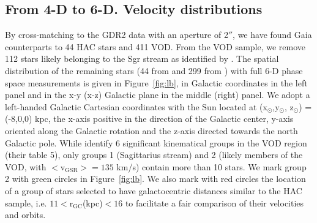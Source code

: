 \documentclass[fleqn,usenatbib]{mnras}
\begin{document}
\subsection{From 4-D to 6-D. Velocity distributions}
%
By cross-matching to the GDR2 data with an aperture of 2$''$, we have
found Gaia counterparts to 44 HAC stars and 411 VOD. From the VOD
sample, we remove 112 stars likely belonging to the Sgr stream as
identified by \citep[][, their group 1]{Vivas2016}. The spatial
distribution of the remaining stars (44 from \citealt{Simion2018} and
299 from \citealt{Vivas2016}) with full 6-D phase space measurements
is given in Figure~\ref{fig:lb}, in Galactic coordinates in the left
panel and in the x-y (x-z) Galactic plane in the middle (right)
panel. We adopt a left-handed Galactic Cartesian coordinates with the
Sun located at (x$_{\odot}$,y$_{\odot}$, z$_{\odot}$) = (-8,0,0) kpc,
the x-axis positive in the direction of the Galactic center, y-axis
oriented along the Galactic rotation and the z-axis directed towards
the north Galactic pole. While \citealt{Vivas2016} identify 6
significant kinematical groups in the VOD region (their table 5), only
groups 1 (Sagittarius stream) and 2 (likely members of the VOD, with
$\mathrm{<v_{GSR}>}= 135$ km/s) contain more than 10 stars. We mark
group 2 with green circles in Figure~\ref{fig:lb}. We also mark with
red circles the location of a group of stars selected to have
galactocentric distances similar to the HAC sample, i.e.
$11\mathrm{<r_{GC}}$(kpc)$<16$ to facilitate a fair comparison of their
velocities and orbits.
%
\end{document}
